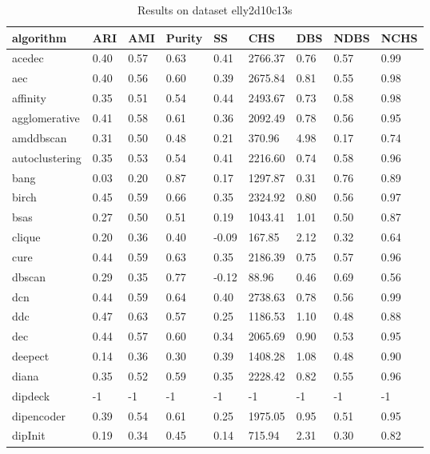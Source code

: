 \begin{table}[H]
\centering
\caption{Results on dataset elly2d10c13s}
\label{S62_Table}
\begin{tabular}{|l|l|l|l|l|l|l|l|l|}
\hline
algorithm & ARI & AMI & Purity & SS & CHS & DBS & NDBS & NCHS \\
\hline
acedec & 0.40 & 0.57 & 0.63 & 0.41 & 2766.37 & 0.76 & 0.57 & 0.99 \\
\hline
aec & 0.40 & 0.56 & 0.60 & 0.39 & 2675.84 & 0.81 & 0.55 & 0.98 \\
\hline
affinity & 0.35 & 0.51 & 0.54 & 0.44 & 2493.67 & 0.73 & 0.58 & 0.98 \\
\hline
agglomerative & 0.41 & 0.58 & 0.61 & 0.36 & 2092.49 & 0.78 & 0.56 & 0.95 \\
\hline
amddbscan & 0.31 & 0.50 & 0.48 & 0.21 & 370.96 & 4.98 & 0.17 & 0.74 \\
\hline
autoclustering & 0.35 & 0.53 & 0.54 & 0.41 & 2216.60 & 0.74 & 0.58 & 0.96 \\
\hline
bang & 0.03 & 0.20 & 0.87 & 0.17 & 1297.87 & 0.31 & 0.76 & 0.89 \\
\hline
birch & 0.45 & 0.59 & 0.66 & 0.35 & 2324.92 & 0.80 & 0.56 & 0.97 \\
\hline
bsas & 0.27 & 0.50 & 0.51 & 0.19 & 1043.41 & 1.01 & 0.50 & 0.87 \\
\hline
clique & 0.20 & 0.36 & 0.40 & -0.09 & 167.85 & 2.12 & 0.32 & 0.64 \\
\hline
cure & 0.44 & 0.59 & 0.63 & 0.35 & 2186.39 & 0.75 & 0.57 & 0.96 \\
\hline
dbscan & 0.29 & 0.35 & 0.77 & -0.12 & 88.96 & 0.46 & 0.69 & 0.56 \\
\hline
dcn & 0.44 & 0.59 & 0.64 & 0.40 & 2738.63 & 0.78 & 0.56 & 0.99 \\
\hline
ddc & 0.47 & 0.63 & 0.57 & 0.25 & 1186.53 & 1.10 & 0.48 & 0.88 \\
\hline
dec & 0.44 & 0.57 & 0.60 & 0.34 & 2065.69 & 0.90 & 0.53 & 0.95 \\
\hline
deepect & 0.14 & 0.36 & 0.30 & 0.39 & 1408.28 & 1.08 & 0.48 & 0.90 \\
\hline
diana & 0.35 & 0.52 & 0.59 & 0.35 & 2228.42 & 0.82 & 0.55 & 0.96 \\
\hline
dipdeck & -1 & -1 & -1 & -1 & -1 & -1 & -1 & -1 \\
\hline
dipencoder & 0.39 & 0.54 & 0.61 & 0.25 & 1975.05 & 0.95 & 0.51 & 0.95 \\
\hline
dipInit & 0.19 & 0.34 & 0.45 & 0.14 & 715.94 & 2.31 & 0.30 & 0.82 \\

\end{tabular}
\end{table}
